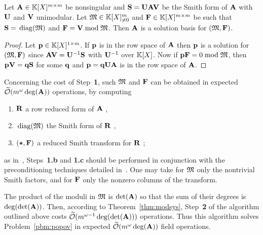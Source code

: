\documentclass[preprint]{sig-alternate-05-2015}
\begin{document}
\vspace{-0.1cm}
\begin{lem}
  \label{lem:reduction}
  Let $\mat{A} \in \polMatSpace[\rdim]$ be nonsingular and $\smith = \mat{U}
  \mat{A} \mat{V}$ be the Smith form of $\mat{A}$ with $\mat{U}$ and $\mat{V}$
  unimodular. Let $\mathfrak{M} \in \mathbb{K}[X]_{\neq 0}^m$ and $\sys \in
  \polMatSpace[\rdim]$ be such that $\smith = \diag{\Modulus}$ and $\sys =
  \mat{V} \bmod \Modulus$. Then $\mat{A}$ is a solution basis for
  $(\Modulus,\sys)$.
\end{lem}
\begin{proof}
  Let $\row{p} \in \polMatSpace[1][\rdim]$. If $\row{p}$ is in the row space of
  $\mat{A}$ then $\row{p}$ is a solution for $(\Modulus,\sys)$ since $\mat{A}
  \mat{V} = \mat{U}^{-1} \smith$ with $\mat{U}^{-1}$ over $\mathbb{K}[X]$. Now if
  $\row{p} \sys = 0 \bmod \Modulus$, then $\row{p} \mat{V} = \row{q} \smith$
  for some $\row{q}$ and $\row{p} = \row{q} \mat{U} \mat{A}$ is in the row
  space of $\mat{A}$.
\end{proof}
\vspace{-0.15cm}

Concerning the cost of Step~\textbf{1}, such $\mathfrak{M}$ and $\sys$ can be
obtained in expected $\softO{\rdim^\expmatmul \deg(\mat{A})}$ operations, by
computing
\begin{enumerate}[{\bf {1}.a}]
  \setlength{\itemsep}{0cm}
  \item $\mat{R}$ a row reduced form of $\mat{A}$ \cite[Theorem 18]{GuSaStVa12},
  \item $\,\mathrm{diag}(\mathfrak{M})$ the Smith form of $\mat{R}$ \cite[Algorithm 12]{Storjohann03},
  \item $(\anyMat,\sys)$ a reduced Smith transform for $\mat{R}$ \cite[Figure 3.2]{Gupta11};
\end{enumerate}
as in~\cite[Figure 6.1]{Gupta11}, Steps~\textbf{1.b} and \textbf{1.c} should be
performed in conjunction with the preconditioning techniques detailed
in~\cite{KaKrSa90}. One may take for $\mathfrak{M}$ only the nontrivial Smith factors,
and for $\sys$ only the nonzero columns of the transform.

The product of the moduli in $\mathfrak{M}$ is $\det(\mat{A})$ so that the sum of
their degrees is $\deg(\det(\mat{A}))$. Then, according to
Theorem~\ref{thm:modsys}, Step~\textbf{2} of the algorithm outlined above costs
$\softO{\rdim^{\expmatmul-1} \deg(\det(\mat{A}))}$ operations. Thus this
algorithm solves Problem~\ref{pbm:popov} in expected $\softO{\rdim^\expmatmul
  \deg(\mat{A})}$ field operations.
\end{document}
